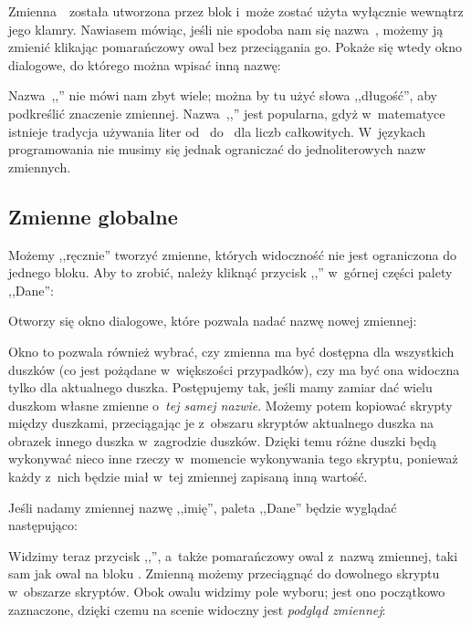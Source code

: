 \documentclass[a4paper]{report}
\begin{document}
Zmienna~~została utworzona przez blok  i~może zostać użyta wyłącznie wewnątrz jego klamry. Nawiasem mówiąc, jeśli nie spodoba nam się nazwa~, możemy ją zmienić klikając pomarańczowy owal bez przeciągania go. Pokaże się wtedy okno dialogowe, do którego można wpisać inną nazwę:\nopagebreak


Nazwa~,,'' nie mówi nam zbyt wiele; można by tu użyć słowa ,,długość'', aby podkreślić znaczenie zmiennej. Nazwa~,,'' jest popularna, gdyż w~matematyce istnieje tradycja używania liter od~ do~ dla liczb całkowitych. W~językach programowania nie musimy się jednak ograniczać do jednoliterowych nazw zmiennych.

\subsection{Zmienne globalne}

Możemy ,,ręcznie'' tworzyć zmienne, których widoczność nie jest ograniczona do jednego bloku. Aby to zrobić, należy kliknąć przycisk ,,'' w~górnej części palety ,,Dane'':\nopagebreak


Otworzy się okno dialogowe, które pozwala nadać nazwę nowej zmiennej:\nopagebreak


Okno to pozwala również wybrać, czy zmienna ma być dostępna dla wszystkich duszków (co jest pożądane w~większości przypadków), czy ma być ona widoczna tylko dla aktualnego duszka. Postępujemy tak, jeśli mamy zamiar dać wielu duszkom własne zmienne o~\emph{tej samej nazwie}. Możemy potem kopiować skrypty między duszkami, przeciągając je z~obszaru skryptów aktualnego duszka na obrazek innego duszka w~zagrodzie duszków. Dzięki temu różne duszki będą wykonywać nieco inne rzeczy w~momencie wykonywania tego skryptu, ponieważ każdy z~nich będzie miał w~tej zmiennej zapisaną inną wartość.

Jeśli nadamy zmiennej nazwę ,,imię'', paleta ,,Dane'' będzie wyglądać następująco:\nopagebreak


Widzimy teraz przycisk ,,'', a~także pomarańczowy owal z~nazwą zmiennej, taki sam jak owal na bloku . Zmienną możemy przeciągnąć do dowolnego skryptu w~obszarze skryptów. Obok owalu widzimy pole wyboru; jest ono początkowo zaznaczone, dzięki czemu na scenie widoczny jest \emph{podgląd zmiennej}:\nopagebreak
\end{document}
